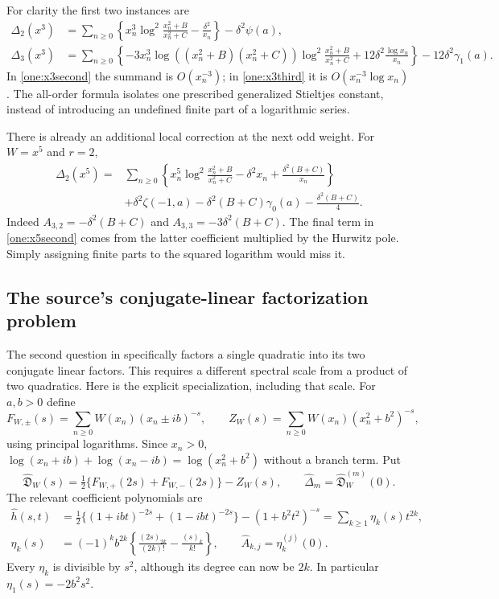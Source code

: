 \documentclass[11pt,a4paper]{article}
\numberwithin{equation}{section}
\theoremstyle{plain}
\theoremstyle{definition}
\theoremstyle{remark}
\begin{document}
For clarity the first two instances are
\begin{align}
 \Delta_2(x^3)&=\sum_{n\ge0}\left\{
      x_n^3\log^2\frac{x_n^2+B}{x_n^2+C}-\frac{\delta^2}{x_n}\right\}
                         -\delta^2\psi(a),\label{one:x3second}\\
 \Delta_3(x^3)&=\sum_{n\ge0}\left\{
      -3x_n^3\log((x_n^2+B)(x_n^2+C))
                     \log^2\frac{x_n^2+B}{x_n^2+C}
                 +12\delta^2\frac{\log x_n}{x_n}\right\}
                         -12\delta^2\gamma_1(a).\label{one:x3third}
\end{align}
In \eqref{one:x3second} the summand is $O(x_n^{-3})$; in
\eqref{one:x3third} it is $O(x_n^{-3}\log x_n)$.
The all-order formula isolates one prescribed generalized Stieltjes
constant, instead of introducing an undefined finite part of a
logarithmic series.

There is already an additional local correction at the next odd weight.
For $W=x^5$ and $r=2$,
\begin{equation}\label{one:x5second}
 \begin{split}
 \Delta_2(x^5)={}&\sum_{n\ge0}\left\{
 x_n^5\log^2\frac{x_n^2+B}{x_n^2+C}
       -\delta^2x_n+\frac{\delta^2(B+C)}{x_n}\right\}\\
 &+\delta^2\zeta(-1,a)
       -\delta^2(B+C)\gamma_0(a)-\frac{\delta^2(B+C)}4.
 \end{split}
\end{equation}
Indeed $A_{3,2}=-\delta^2(B+C)$ and
$A_{3,3}=-3\delta^2(B+C)$.  The final term in
\eqref{one:x5second} comes from the latter coefficient multiplied
by the Hurwitz pole.  Simply assigning finite parts to the squared
logarithm would miss it.

\subsection{The source's conjugate-linear factorization problem}
\label{one:linear-section}

The second question in \cite{Quadratic} specifically factors a single
quadratic into its two conjugate linear factors.  This requires a
different spectral scale from a product of two quadratics.  Here is the
explicit specialization, including that scale.  For $a,b>0$ define
\[
 F_{W,\pm}(s)=\sum_{n\ge0}W(x_n)(x_n\pm ib)^{-s},\qquad
 Z_W(s)=\sum_{n\ge0}W(x_n)(x_n^2+b^2)^{-s},
\]
using principal logarithms.  Since $x_n>0$,
$\log(x_n+ib)+\log(x_n-ib)=\log(x_n^2+b^2)$ without a branch term.
Put
\[
 \widehat{\mathfrak D}_W(s)=\tfrac12
        \{F_{W,+}(2s)+F_{W,-}(2s)\}-Z_W(s),\qquad
 \widehat\Delta_m=\widehat{\mathfrak D}_W^{(m)}(0).
\]
The relevant coefficient polynomials are
\begin{align}
 \widehat h(s,t)
 &=\tfrac12\{(1+ibt)^{-2s}+(1-ibt)^{-2s}\}
                              -(1+b^2t^2)^{-s}
    =\sum_{k\ge1}\eta_k(s)t^{2k},\label{one:linear-h}\\
 \eta_k(s)&=(-1)^kb^{2k}
       \left\{\frac{(2s)_{2k}}{(2k)!}-\frac{(s)_k}{k!}\right\},
 \qquad \widehat A_{k,j}=\eta_k^{(j)}(0).
 \label{one:linear-eta}
\end{align}
Every $\eta_k$ is divisible by $s^2$, although its degree can now
be $2k$.  In particular $\eta_1(s)=-2b^2s^2$.
\end{document}
